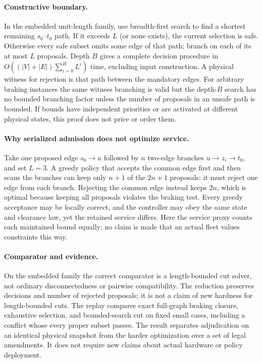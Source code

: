 \documentclass[11pt]{article}
\begin{document}
\paragraph{Constructive boundary.}
In the embedded unit-length family, use breadth-first search to find a shortest remaining $s_0$--$t_0$ path. If it exceeds $L$ (or none exists), the current selection is safe. Otherwise every safe subset omits some edge of that path; branch on each of its at most $L$ proposals. Depth $B$ gives a complete decision procedure in $O((|V|+|E|)\sum_{i=0}^B L^i)$ time, excluding input construction. A physical witness for rejection is that path between the mandatory edges. For arbitrary braking instances the same witness branching is valid but the depth-$B$ search has no bounded branching factor unless the number of proposals in an unsafe path is bounded. If bounds have independent priorities or are activated at different physical states, this proof does not price or order them.

\paragraph{Why serialized admission does not optimize service.}
Take one proposed edge $s_0\to u$ followed by $n$ two-edge branches $u\to z_i\to t_0$, and set $L=3$. A greedy policy that accepts the common edge first and then scans the branches can keep only $n+1$ of the $2n+1$ proposals: it must reject one edge from each branch. Rejecting the common edge instead keeps $2n$, which is optimal because keeping all proposals violates the braking test. Every greedy acceptance may be locally correct, and the controller may obey the same state and clearance law, yet the retained service differs. Here the service proxy counts each maintained bound equally; no claim is made that an actual fleet values constraints this way.

\paragraph{Comparator and evidence.}
On the embedded family the correct comparator is a length-bounded cut solver, not ordinary disconnectedness or pairwise compatibility. The reduction preserves decisions and number of rejected proposals; it is not a claim of new hardness for length-bounded cuts. The replay compares exact full-graph braking closure, exhaustive selection, and bounded-search cut on fixed small cases, including a conflict whose every proper subset passes. The result separates adjudication on an identical physical snapshot from the harder optimization over a set of legal amendments. It does not require new claims about actual hardware or policy deployment.
\end{document}
